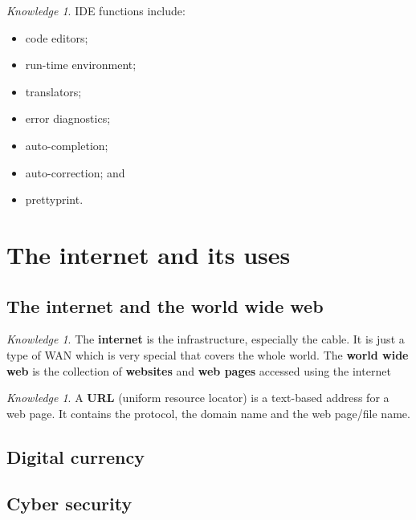 \documentclass[8pt]{article}
\theoremstyle{remark}
\newtheorem{knowledge}[method]{Knowledge}
\begin{document}
            \begin{knowledge}
                IDE functions include:
                \begin{itemize}
                    \item code editors;
                    \item run-time environment;
                    \item translators;
                    \item error diagnostics;
                    \item auto-completion;
                    \item auto-correction; and
                    \item prettyprint.
                \end{itemize}
            \end{knowledge}

    \section{The internet and its uses}
        
        \subsection{The internet and the world wide web}

            \begin{knowledge}
                The \textbf{internet} is the infrastructure, especially the cable. It is just a type of WAN which is very special that covers the whole world. The \textbf{world wide web} is the collection of \textbf{websites} and \textbf{web pages} accessed using the internet
            \end{knowledge}

            \begin{knowledge}
                A \textbf{URL} (uniform resource locator) is a text-based address for a web page. It contains the protocol, the domain name and the web page/file name.
            \end{knowledge}

            

        \subsection{Digital currency}

        \subsection{Cyber security}
\end{document}
